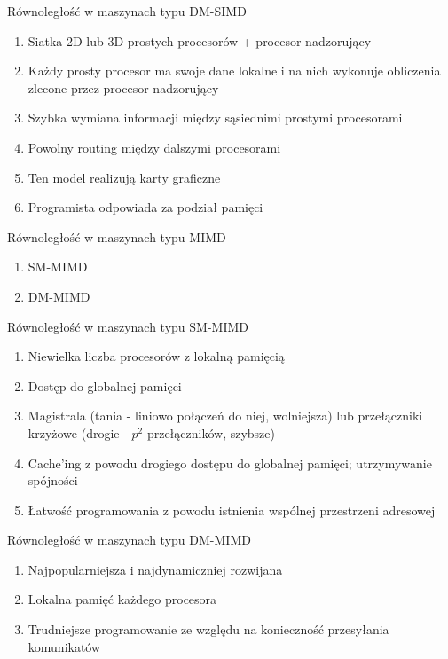 \documentclass{beamer}
\begin{document}
\begin{frame}{Równoległość w maszynach typu DM-SIMD}
  \begin{enumerate}
  \item Siatka 2D lub 3D prostych procesorów + procesor nadzorujący
  \item Każdy prosty procesor ma swoje dane lokalne i na nich wykonuje obliczenia zlecone przez procesor nadzorujący
  \item Szybka wymiana informacji między sąsiednimi prostymi procesorami
  \item Powolny routing między dalszymi procesorami
  \item Ten model realizują karty graficzne
  \item Programista odpowiada za podział pamięci
  \end{enumerate}
\end{frame}

\begin{frame}{Równoległość w maszynach typu MIMD}
  \begin{enumerate}
  \item SM-MIMD
  \item DM-MIMD
  \end{enumerate}
\end{frame}

\begin{frame}{Równoległość w maszynach typu SM-MIMD}
  \begin{enumerate}
  \item Niewielka liczba procesorów z lokalną pamięcią
  \item Dostęp do globalnej pamięci
  \item Magistrala (tania - liniowo połączeń do niej, wolniejsza) lub przełączniki krzyżowe (drogie - $p^2$ przełączników, szybsze)
  \item Cache'ing z powodu drogiego dostępu do globalnej pamięci; utrzymywanie spójności
  \item Łatwość programowania z powodu istnienia wspólnej przestrzeni adresowej
  \end{enumerate}
\end{frame}

\begin{frame}{Równoległość w maszynach typu DM-MIMD}
  \begin{enumerate}
  \item Najpopularniejsza i najdynamiczniej rozwijana
  \item Lokalna pamięć każdego procesora
  \item Trudniejsze programowanie ze względu na konieczność przesyłania komunikatów
  \end{enumerate}
\end{frame}
\end{document}
